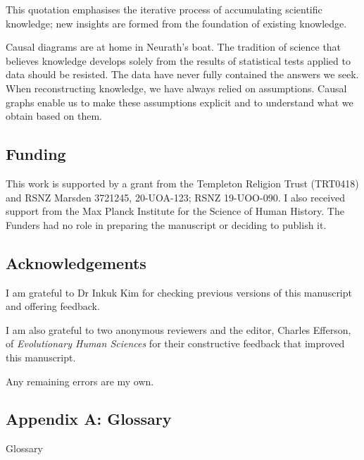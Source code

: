 \documentclass[
  single column]{article}
\begin{document}
This quotation emphasises the iterative process of accumulating
scientific knowledge; new insights are formed from the foundation of
existing knowledge.

Causal diagrams are at home in Neurath's boat. The tradition of science
that believes knowledge develops solely from the results of statistical
tests applied to data should be resisted. The data have never fully
contained the answers we seek. When reconstructing knowledge, we have
always relied on assumptions. Causal graphs enable us to make these
assumptions explicit and to understand what we obtain based on them.

\newpage{}

\subsection{Funding}\label{funding}

This work is supported by a grant from the Templeton Religion Trust
(TRT0418) and RSNZ Marsden 3721245, 20-UOA-123; RSNZ 19-UOO-090. I also
received support from the Max Planck Institute for the Science of Human
History. The Funders had no role in preparing the manuscript or deciding
to publish it.

\subsection{Acknowledgements}\label{acknowledgements}

I am grateful to Dr Inkuk Kim for checking previous versions of this
manuscript and offering feedback.

I am also grateful to two anonymous reviewers and the editor, Charles
Efferson, of \emph{Evolutionary Human Sciences} for their constructive
feedback that improved this manuscript.

Any remaining errors are my own.

\newpage{}

\subsection{Appendix A: Glossary}\label{id-app-a}

\begin{table}

\caption{\label{tbl-experiments}Glossary}

\centering{

\glossaryTerms

}

\end{table}%
\end{document}

